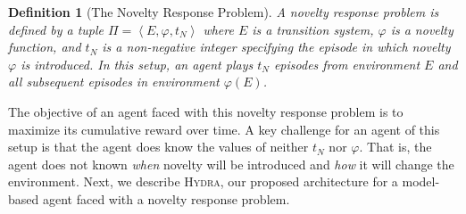 \documentclass[letterpaper]{article} %
\newcommand{\tuple}[1]{\ensuremath{\left \langle #1 \right \rangle }} %
\newcommand{\hydra}{\textsc{Hydra}\xspace} %
\newtheorem{definition}{Definition} %
\begin{document}
\begin{definition}[The Novelty Response Problem]
A novelty response problem is defined by a tuple $\Pi=\tuple{E, \varphi, t_N}$ 
where $E$ is a transition system, $\varphi$ is a novelty function, 
and $t_N$ is a non-negative integer specifying the episode in which novelty $\varphi$ is introduced. 
In this setup, an agent plays $t_N$ episodes from environment $E$ 
and all subsequent episodes in environment $\varphi(E)$. 
\end{definition}

The objective of an agent faced with this novelty response problem is to maximize its cumulative reward over time. 
A key challenge for an agent of this setup is that the agent does know the values of neither $t_N$ nor $\varphi$. 
That is, the agent does not known \emph{when} novelty will be introduced and \emph{how} it will change the environment. Next, we describe \hydra, our proposed architecture for a model-based agent faced with a novelty response problem. 








\end{document}

